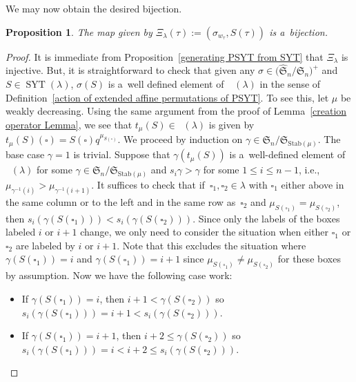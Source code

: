 \documentclass[pdftex]{sigma}
\numberwithin{equation}{section}
\newtheorem{Proposition}[Theorem]{Proposition}
\theoremstyle{definition}
\DeclareMathOperator{\SYT}{\mathrm{SYT}}
\DeclareMathOperator{\PSYT}{\mathrm{PSYT}_{\geq 0}}
\begin{document}
We may now obtain the desired bijection.

\begin{Proposition}\label{bijection between PSYT and pairs on min coset reps and SYT}
 The map \smash{$\Xi_{\lambda}\colon \PSYT(\lambda) \rightarrow \bigl(\widehat{\mathfrak{S}}_n/\mathfrak{S}_n \bigr)^{+} \times \SYT(\lambda)$} given by
 $\Xi_{\lambda}(\tau) := (\sigma_{w_{\tau}},\allowbreak S(\tau))$ is a~bijection.
\end{Proposition}
\begin{proof}
 It is immediate from Proposition~\ref{generating PSYT from SYT} that $\Xi_{\lambda}$ is injective. But, it is straightforward to check that given any $\sigma \in \bigl(\widehat{\mathfrak{S}}_n/\mathfrak{S}_n \bigr)^{+}$ and $S \in \SYT(\lambda)$, $\sigma(S)$ is a~well defined element of~$\PSYT(\lambda)$ in the sense of Definition~\ref{action of extended affine permutations of PSYT}. To see this, let $\mu$ be weakly decreasing. Using the same argument from the proof of Lemma~\ref{creation operator Lemma}, we see that $t_{\mu}(S) \in \PSYT(\lambda)$ is given by~${t_{\mu}(S)(\square) = S(\square) q^{\mu_{S(\square)}}}$. We proceed by induction on $\gamma \in \mathfrak{S}_n/\mathfrak{S}_{\text{Stab}(\mu)}$. The base case $\gamma = 1$ is trivial. Suppose that $\gamma(t_{\mu}(S))$ is a~well-defined element of $\PSYT(\lambda)$ for some $\gamma \in \mathfrak{S}_n/\mathfrak{S}_{\text{Stab}(\mu)}$ and $s_i\gamma > \gamma$ for some $1\leq i \leq n-1$, i.e.,
 $\mu_{\gamma^{-1}(i)} > \mu_{\gamma^{-1}(i+1)}$. It suffices to check that if~${\square_1,\square_2 \in \lambda}$ with $\square_1$ either above in the same column or to the left and in the same row as~$\square_2$ and $\mu_{S(\square_1)} = \mu_{S(\square_2)}$, then $s_i(\gamma(S(\square_1))) < s_i(\gamma(S(\square_2)))$. Since only the labels of the boxes labeled $i$ or $i+1$ change, we only need to consider the situation when either $\square_1$ or $\square_2$ are labeled by $i$ or $i+1$. Note that this excludes the situation where $\gamma(S(\square_1)) = i$ and $\gamma(S(\square_1)) = i+1$ since $\mu_{S(\square_1)} \neq \mu_{S(\square_2)}$ for these boxes by assumption. Now we have the following case work:
 \begin{itemize}
\itemsep=0pt
 \item If $ \gamma(S(\square_1)) = i$, then $ i+1 < \gamma(S(\square_2))$ so $s_i(\gamma(S(\square_1))) = i+1 < s_i(\gamma(S(\square_2)))$.
 \item If $\gamma(S(\square_1)) = i+1$, then $i+2 \leq \gamma(S(\square_2))$ so $s_i(\gamma(S(\square_1))) = i < i+2 \leq s_i(\gamma(S(\square_2)))$.

\end{itemize}
\end{proof}
\end{document}
